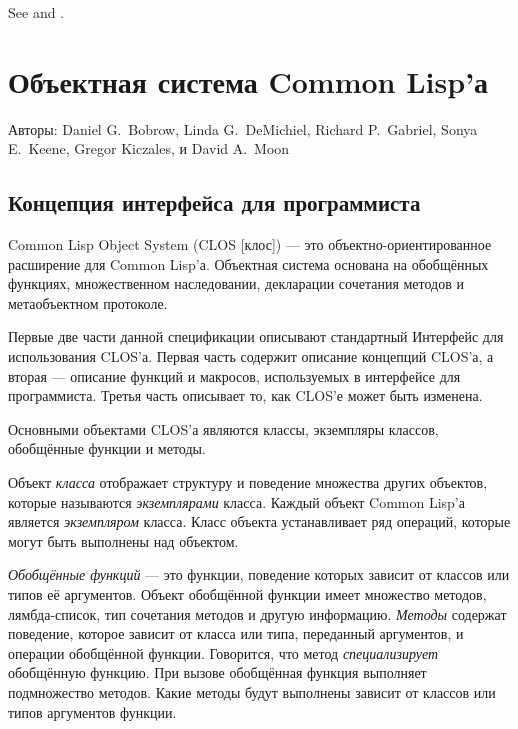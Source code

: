 \begin{defmac}

See  and .
\end{defmac}


\else %

\chapter{Объектная система Common Lisp'а}
\label{CLOS}

Авторы:  Daniel G.~Bobrow, Linda G.~DeMichiel,
Richard P.~Gabriel, Sonya E.~Keene, Gregor Kiczales,
и David A.~Moon

\section{Концепция интерфейса для программиста}

Common Lisp Object System (CLOS [клос]) --- это объектно-ориентированное
расширение для Common Lisp'а.  Объектная система основана на обобщённых
функциях, множественном наследовании, декларации сочетания методов и
метаобъектном протоколе.

Первые две части данной спецификации описывают стандартный Интерфейс для
использования CLOS'а. Первая часть содержит описание концепций CLOS'а, а вторая
--- описание функций и макросов, используемых в 
интерфейсе для программиста. Третья часть описывает то, как CLOS'е может быть
изменена.

Основными объектами CLOS'а являются классы, экземпляры классов, обобщённые
функции и методы.

Объект \emph{класса} отображает структуру и поведение множества других
объектов, которые называются \emph{экземплярами} класса.
Каждый объект Common Lisp'а является \emph{экземпляром} класса. Класс объекта
устанавливает ряд операций, которые могут быть выполнены над объектом.

\emph{Обобщённые функций} --- это функции, поведение которых зависит от классов
или типов её аргументов. Объект обобщённой функции имеет множество методов,
лямбда-список, тип сочетания методов и другую информацию. \emph{Методы} содержат
поведение, которое зависит от класса или типа, переданный аргументов, и операции
обобщённой функции. Говорится, что метод \emph{специализирует} обобщённую
функцию. При вызове обобщённая функция выполняет подмножество методов. Какие
методы будут выполнены зависит от классов или типов аргументов функции.

